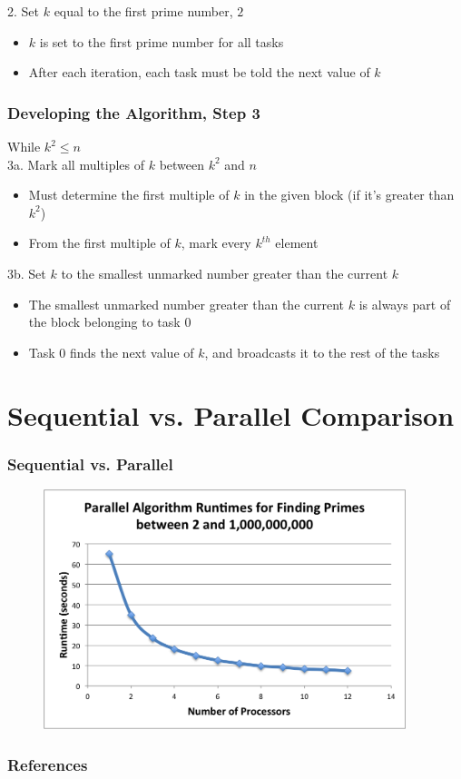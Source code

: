 \documentclass[13pt]{beamer}
\begin{document}
\begin{frame}
  \alert{2. Set $k$ equal to the first prime number, $2$}
  \begin{itemize}
    \item $k$ is set to the first prime number for all tasks
    \item After each iteration, each task must be told the next value of $k$

  \end{itemize}
\end{frame}

\begin{frame}
\frametitle{Developing the Algorithm, Step 3}
\alert{While $k^2 \leq n$\\}
\alert{3a. Mark all multiples of $k$ between $k^2$ and $n$}
\begin{itemize}
  \item Must determine the first multiple of $k$ in the given block (if it's greater than $k^2$)
  \item From the first multiple of $k$, mark every $k^{th}$ element
\end{itemize}

\alert{3b. Set $k$ to the smallest unmarked number greater than the current $k$}
\begin{itemize}
  \item The smallest unmarked number greater than the current $k$ is always part of the block belonging to task 0
  \item Task 0 finds the next value of $k$, and broadcasts it to the rest of the tasks
\end{itemize}
\end{frame}

\section{Sequential vs. Parallel Comparison} %
\begin{frame}
\frametitle{Sequential vs. Parallel}
  \begin{figure}
    \includegraphics[height=7cm]{./sieve_benchmark.png}
  \end{figure}
\end{frame}

 \begin{frame}
  \frametitle{References}
  \nocite{*} 
  
\end{frame}
\end{document}
